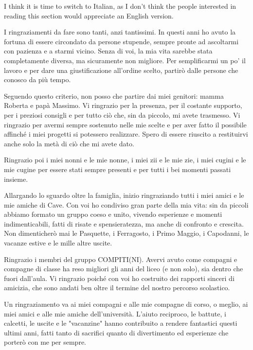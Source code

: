 \documentclass[english,binding=0.6cm,noexaminfo]{sapthesis}
\begin{document}
\begin{acknowledgments}
I think it is time to switch to Italian, as I don't think the people interested in reading this section would appreciate an English version.


I ringraziamenti da fare sono tanti, anzi tantissimi. In questi anni ho avuto la fortuna di essere circondato da persone stupende, sempre pronte ad ascoltarmi con pazienza e a starmi vicino. Senza di voi, la mia vita sarebbe stata completamente diversa, ma sicuramente non migliore. Per semplificarmi un po' il lavoro e per dare una giustificazione all'ordine scelto, partirò dalle persone che conosco da più tempo.

Seguendo questo criterio, non posso che partire dai miei genitori: mamma Roberta e papà Massimo. Vi ringrazio per la presenza, per il costante supporto, per i preziosi consigli e per tutto ciò che, sin da piccolo, mi avete trasmesso. Vi ringrazio per avermi sempre sostenuto nelle mie scelte e per aver fatto il possibile affinché i miei progetti si potessero realizzare. Spero di essere riuscito a restituirvi anche solo la metà di ciò che mi avete dato.

Ringrazio poi i miei nonni e le mie nonne, i miei zii e le mie zie, i miei cugini e le mie cugine per essere stati sempre presenti e per tutti i bei momenti passati insieme.

Allargando lo sguardo oltre la famiglia, inizio ringraziando tutti i miei amici e le mie amiche di Cave. Con voi ho condiviso gran parte della mia vita: sin da piccoli abbiamo formato un gruppo coeso e unito, vivendo esperienze e momenti indimenticabili, fatti di risate e spensieratezza, ma anche di confronto e crescita. Non dimenticherò mai le Pasquette, i Ferragosto, i Primo Maggio, i Capodanni, le vacanze estive e le mille altre uscite.

Ringrazio i membri del gruppo COMPITI(NI). Avervi avuto come compagni e compagne di classe ha reso migliori gli anni del liceo (e non solo), sia dentro che fuori dall'aula. Vi ringrazio poiché con voi ho costruito dei rapporti sinceri di amicizia, che sono andati ben oltre il termine del nostro percorso scolastico.

Un ringraziamento va ai miei compagni e alle mie compagne di corso, o meglio, ai miei amici e alle mie amiche dell'università. L'aiuto reciproco, le battute, i calcetti, le uscite e le "vacanzine" hanno contribuito a rendere fantastici questi ultimi anni, fatti tanto di sacrifici quanto di divertimento ed esperienze che porterò con me per sempre.


\end{acknowledgments}
\end{document}
